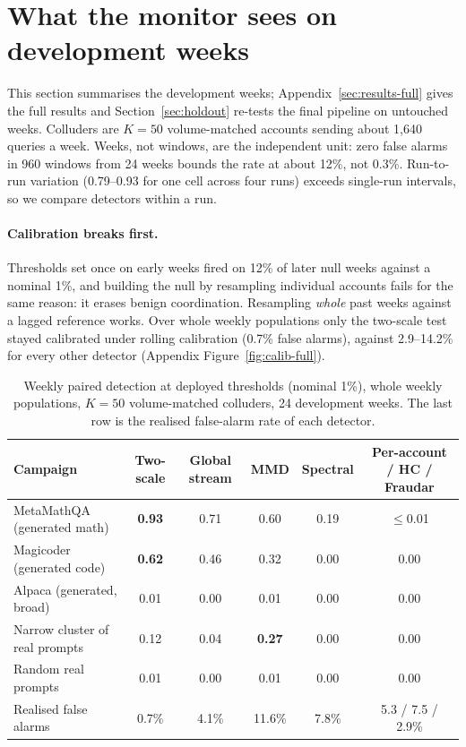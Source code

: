 \section{What the monitor sees on development weeks}
\label{sec:results}

This section summarises the development weeks; Appendix~\ref{sec:results-full} gives the full results and Section~\ref{sec:holdout} re-tests the final pipeline on untouched weeks. Colluders are $K=50$ volume-matched accounts sending about 1{,}640 queries a week. Weeks, not windows, are the independent unit: zero false alarms in 960 windows from 24 weeks bounds the rate at about 12\%, not 0.3\%. Run-to-run variation (0.79--0.93 for one cell across four runs) exceeds single-run intervals, so we compare detectors within a run.

\paragraph{Calibration breaks first.} Thresholds set once on early weeks fired on 12\% of later null weeks against a nominal 1\%, and building the null by resampling individual accounts fails for the same reason: it erases benign coordination. Resampling \emph{whole} past weeks against a lagged reference works. Over whole weekly populations only the two-scale test stayed calibrated under rolling calibration (0.7\% false alarms), against 2.9--14.2\% for every other detector (Appendix Figure~\ref{fig:calib-full}).

\begin{table}[t]
\caption{Weekly paired detection at deployed thresholds (nominal 1\%), whole weekly populations, $K=50$ volume-matched colluders, 24 development weeks. The last row is the realised false-alarm rate of each detector.}
\label{tab:deploy}
\begin{center}
\footnotesize\setlength{\tabcolsep}{4pt}
\begin{tabular}{lccccc}
\toprule
Campaign & Two-scale & Global stream & MMD & Spectral & Per-account / HC / Fraudar \\
\midrule
MetaMathQA (generated math) & \textbf{0.93} & 0.71 & 0.60 & 0.19 & $\le$0.01 \\
Magicoder (generated code) & \textbf{0.62} & 0.46 & 0.32 & 0.00 & 0.00 \\
Alpaca (generated, broad) & 0.01 & 0.00 & 0.01 & 0.00 & 0.00 \\
Narrow cluster of real prompts & 0.12 & 0.04 & \textbf{0.27} & 0.00 & 0.00 \\
Random real prompts & 0.01 & 0.00 & 0.01 & 0.00 & 0.00 \\
\midrule
Realised false alarms & 0.7\% & 4.1\% & 11.6\% & 7.8\% & 5.3 / 7.5 / 2.9\% \\
\bottomrule
\end{tabular}
\end{center}
\end{table}

